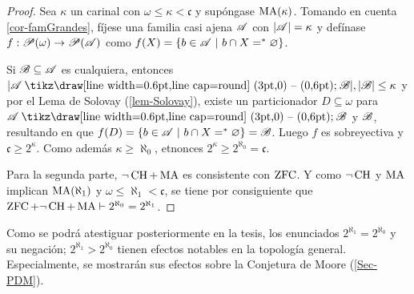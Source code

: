 	\begin{proof}
		Sea $\kappa$ un carinal con $\omega \leq \kappa <\mathfrak{c}$ y supóngase $\operatorname{MA}(\kappa)$. Tomando en cuenta \ref{cor-famGrandes}, fíjese una familia casi ajena $\mathscr{A}$ con $|\mathscr{A}|=\kappa$ y defínase $f:\mathscr{P}(\omega) \to \mathscr{P}(\mathscr{A})$ como $ f(X)=\{ b \in \mathscr{A} \text{ $|$ } b \cap X =^* \varnothing \} $.

		Si $\mathscr{B} \subseteq \mathscr{A}$ es cualquiera, entonces $|\ms{A} \setminus \ms{B}|, |\ms{B}| \leq \kappa$ y por el Lema de Solovay (\ref{lem-Solovay}), existe un particionador $D \subseteq \omega$ para $\ms{A} \setminus \ms{B}$ y $\mathscr{B}$, resultando en que $ f(D)=\{b \in \mathscr{A} \text{ $|$ } b \cap X =^* \varnothing \} = \mathscr{B} $. Luego $f$ es sobreyectiva y $\mathfrak{c} \geq 2^\kappa $. Como además $\kappa \geq \aleph_0$, etnonces $2^\kappa \geq 2^{\aleph_0}=\mathfrak{c}$.

		Para la segunda parte, $\lnot \operatorname{CH} + \operatorname{MA}$ es consistente con $\operatorname{ZFC}$. Y como $\lnot \operatorname{CH}$ y $\operatorname{MA}$ implican $\operatorname{MA}(\aleph_1)$ y $\omega \leq \aleph_1 < \mathfrak{c}$, se tiene por consiguiente que $\operatorname{ZFC}+\lnot \operatorname{CH} + \operatorname{MA} \vdash 2^{\aleph_0}=2^{\aleph_1}$.
	\end{proof}

	Como se podrá atestiguar posteriormente en la tesis, los enunciados $2^{\aleph_1} = 2^{\aleph_0}$ y su negación; $2^{\aleph_1} > 2^{\aleph_0}$ tienen efectos notables en la topología general. Especialmente, se mostrarán sus efectos sobre la Conjetura de Moore (\autoref{Sec-PDM}).